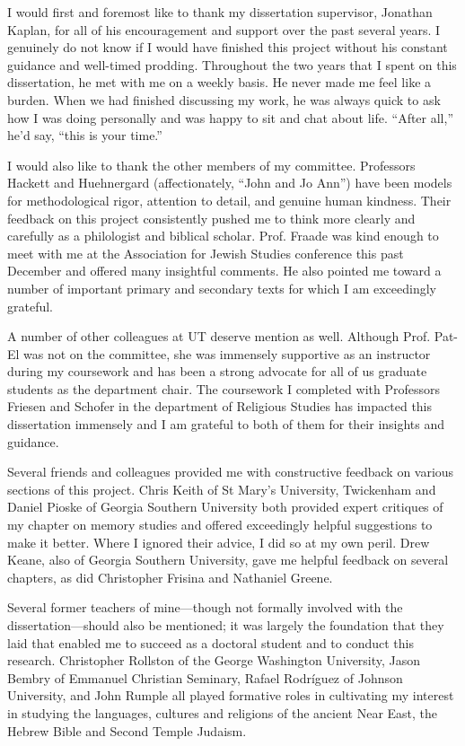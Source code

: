 
I would first and foremost like to thank my dissertation supervisor, Jonathan Kaplan, for all of his encouragement and support over the past several years. I genuinely do not know if I would have finished this project without his constant guidance and well-timed prodding. Throughout the two years that I spent on this dissertation, he met with me on a weekly basis. He never made me feel like a burden. When we had finished discussing my work, he was always quick to ask how I was doing personally and was happy to sit and chat about life. ``After all,'' he'd say, ``this is your time.''

I would also like to thank the other members of my committee. Professors Hackett and Huehnergard (affectionately, ``John and Jo Ann'') have been models for methodological rigor, attention to detail, and genuine human kindness. Their feedback on this project consistently pushed me to think more clearly and carefully as a philologist and biblical scholar. Prof. Fraade was kind enough to meet with me at the Association for Jewish Studies conference this past December and offered many insightful comments. He also pointed me toward a number of important primary and secondary texts for which I am exceedingly grateful.

A number of other colleagues at UT deserve mention as well. Although Prof. Pat-El was not on the committee, she was immensely supportive as an instructor during my coursework and has been a strong advocate for all of us graduate students as the department chair. The coursework I completed with Professors Friesen and Schofer in the department of Religious Studies has impacted this dissertation immensely and I am grateful to both of them for their insights and guidance.

Several friends and colleagues provided me with constructive feedback on various sections of this project. Chris Keith of St Mary's University, Twickenham and Daniel Pioske of Georgia Southern University both provided expert critiques of my chapter on memory studies and offered exceedingly helpful suggestions to make it better. Where I ignored their advice, I did so at my own peril. Drew Keane, also of Georgia Southern University, gave me helpful feedback on several chapters, as did Christopher Frisina and Nathaniel Greene.

Several former teachers of mine---though not formally involved with the dissertation---should also be mentioned; it was largely the foundation that they laid that enabled me to succeed as a doctoral student and to conduct this research. Christopher Rollston of the George Washington University, Jason Bembry of Emmanuel Christian Seminary, Rafael Rodríguez of Johnson University, and John Rumple all played formative roles in cultivating my interest in studying the languages, cultures and religions of the ancient Near East, the Hebrew Bible and Second Temple Judaism.

